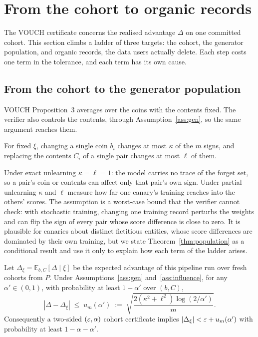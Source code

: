 \section{From the cohort to organic records}\label{sec:organic}

The VOUCH certificate concerns the realised advantage $\Delta$ on one committed cohort.
This section climbs a ladder of three targets: the cohort, the generator population,
and organic records, the data users actually delete. Each step costs one term in the
tolerance, and each term has its own cause.

\subsection{From the cohort to the generator population}

VOUCH Proposition~3 averages over the coins with the contents fixed. The verifier also
controls the contents, through Assumption~\ref{ass:gen}, so the same argument reaches
them.

\begin{assumption}\label{ass:influence}
For fixed $\xi$, changing a single coin $b_i$ changes at most $\kappa$ of the $m$
signs, and replacing the contents $C_i$ of a single pair changes at most $\ell$ of
them.
\end{assumption}

Under exact unlearning $\kappa=\ell=1$: the model carries no trace of the forget set,
so a pair's coin or contents can affect only that pair's own sign. Under partial
unlearning $\kappa$ and $\ell$ measure how far one canary's training reaches into the
others' scores. The assumption is a worst-case bound that the verifier cannot check:
with stochastic training, changing one training record perturbs the weights and can
flip the sign of every pair whose score difference is close to zero. It is plausible
for canaries about distinct fictitious entities, whose score differences are dominated
by their own training, but we state Theorem~\ref{thm:population} as a conditional
result and use it only to explain how each term of the ladder arises.

\begin{theorem}\label{thm:population}
Let $\Delta_\xi=\mathbb{E}_{b,C}[\Delta\mid\xi]$ be the expected advantage of this
pipeline run over fresh cohorts from $P$. Under Assumptions~\ref{ass:gen}
and~\ref{ass:influence}, for any $\alpha'\in(0,1)$, with probability at least
$1-\alpha'$ over $(b,C)$,
\[
|\Delta-\Delta_\xi| \;\le\; u_m(\alpha') \;:=\;
\sqrt{\frac{2(\kappa^2+\ell^2)\log(2/\alpha')}{m}} .
\]
Consequently a two-sided $(\varepsilon,\alpha)$ cohort certificate implies
$|\Delta_\xi|<\varepsilon+u_m(\alpha')$ with probability at least $1-\alpha-\alpha'$.
\end{theorem}

